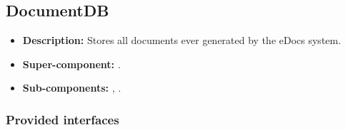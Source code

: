 \subsection{DocumentDB}
\begin{itemize}
    \item \textbf{Description:} Stores all documents ever generated by the eDocs system.
    \item \textbf{Super-component:} .
    \item \textbf{Sub-components:} , .
\end{itemize}

\subsubsection*{Provided interfaces}
